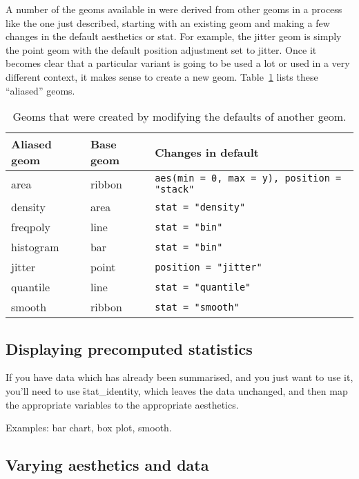 A number of the geoms available in \ggplot were derived from other geoms in a process like the one just described, starting with an existing geom and making a few changes in the default aesthetics or stat.  For example, the jitter geom is simply the point geom with the default position adjustment set to jitter.  Once it becomes clear that a particular variant is going to be used a lot or used in a very different context, it makes sense to create a new geom. Table~\ref{tbl:aliased-geoms} lists these ``aliased'' geoms.

\begin{table}
  \begin{center}
  \begin{tabular}{lll}
    \toprule
    Aliased geom & Base geom & Changes in default \\
    \midrule
    area      & ribbon & \verb!aes(min = 0, max = y), position = "stack"!  \\
    density   & area   & \verb!stat = "density"!    \\
    freqpoly  & line   & \verb!stat = "bin"!        \\
    histogram & bar    & \verb!stat = "bin"!        \\
    jitter    & point  & \verb!position = "jitter"! \\
    quantile  & line   & \verb!stat = "quantile"!   \\
    smooth    & ribbon & \verb!stat = "smooth"!     \\
    \bottomrule
  \end{tabular}
  \end{center}
  \caption{Geoms that were created by modifying the defaults of another geom.}
  \label{tbl:aliased-geoms}
\end{table}

\subsection{Displaying precomputed statistics} 
\label{sub:precomputed}

If you have data which has already been summarised, and you just want to use it, you'll need to use \f{stat_identity}, which leaves the data unchanged, and then map the appropriate variables to the appropriate aesthetics.

Examples:  bar chart, box plot, smooth.

\subsection{Varying aesthetics and data}
\label{sub:different_aesthetics}

